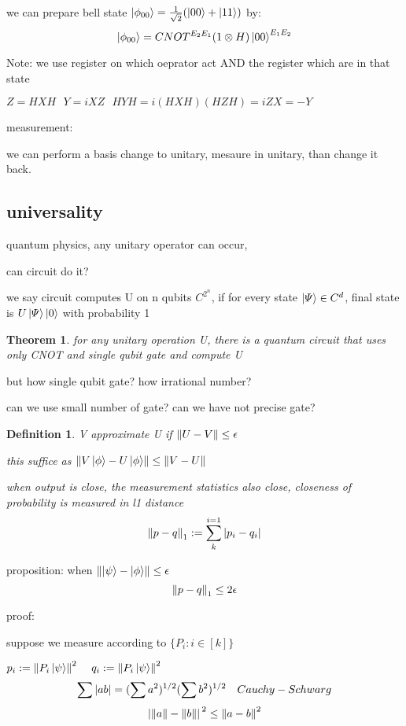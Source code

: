 \documentclass[10pt]{article}
\newcommand{\su}[2]{\sum_{#1}^{#2}}
\theoremstyle{break}
\newtheorem{thm}{Theorem}[subsection]
\newtheorem{defn}{Definition}[subsection]
\begin{document}
    we can prepare bell state $\ket{\phi_{00}}=\frac{1}{\sqrt{2}}(\ket{00}+\ket{11})$
    by:$$\ket{\phi_{00}}=CNOT^{E_2E_1}(1\otimes H)\ket{00}^{E_1E_2}$$ 

    Note: we use register on which oeprator act AND the register which are in that state 

    $Z=HXH~~~Y=iXZ~~~HYH=i(HXH)(HZH)=iZX=-Y$

    measurement:

    we can perform a basis change to unitary, mesaure in unitary, than change it back.


    \subsection{universality}
        quantum physics, any unitary operator can occur,

        can circuit do it?

        we say circuit computes U on n qubits $C^{2^n}$, if for every state 
        $\ket{\varPsi}\in C^d$, final state is $U\ket{\varPsi}\ket{0}$ with probability 1

        \begin{thm}
            for any unitary operation U, there is a quantum circuit that uses 
            only CNOT and single qubit gate and compute U
        \end{thm}

        but how single qubit gate? how irrational number?

        can we use small number of gate? can we have not precise gate?

        \begin{defn}
            V approximate U if $\norm{U-V}\leq\epsilon$

            this suffice as $\norm{V\ket{\phi}-U\ket{\phi}}\leq \norm{V-U}$

            when output is close, the measurement statistics also close, 
            closeness of probability is measured in l1 distance
            $$\norm{p-q}_1:=\su{k}{i=1}\abs{p_i-q_i}$$
        \end{defn}

        proposition: when $\norm{\ket{\psi}-\ket{\phi}}\leq \epsilon$
        $$\norm{p-q}_1\leq 2\epsilon$$

        proof:

        suppose we measure according to $\{P_i: i\in[k]\}$

        $p_i:=\norm{P_i\ket{\psi}}^2~~~~q_i:=\norm{P_i\ket{\psi}}^2$
        $$\sum \abs{ab}=(\sum a^2)^{1/2}(\sum b^2 )^{1/2}~~~Cauchy-Schwarg$$
        $$\abs*{\norm{a}-\norm{b}}^2\leq\norm{a-b}^2$$
\end{document}
